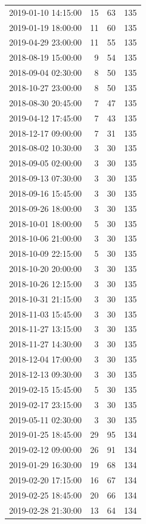 \begin{tabular}{lrrr}
2019-01-10 14:15:00 & 15 & 63 & 135 \\
2019-01-19 18:00:00 & 11 & 60 & 135 \\
2019-04-29 23:00:00 & 11 & 55 & 135 \\
2018-08-19 15:00:00 & 9 & 54 & 135 \\
2018-09-04 02:30:00 & 8 & 50 & 135 \\
2018-10-27 23:00:00 & 8 & 50 & 135 \\
2018-08-30 20:45:00 & 7 & 47 & 135 \\
2019-04-12 17:45:00 & 7 & 43 & 135 \\
2018-12-17 09:00:00 & 7 & 31 & 135 \\
2018-08-02 10:30:00 & 3 & 30 & 135 \\
2018-09-05 02:00:00 & 3 & 30 & 135 \\
2018-09-13 07:30:00 & 3 & 30 & 135 \\
2018-09-16 15:45:00 & 3 & 30 & 135 \\
2018-09-26 18:00:00 & 3 & 30 & 135 \\
2018-10-01 18:00:00 & 5 & 30 & 135 \\
2018-10-06 21:00:00 & 3 & 30 & 135 \\
2018-10-09 22:15:00 & 5 & 30 & 135 \\
2018-10-20 20:00:00 & 3 & 30 & 135 \\
2018-10-26 12:15:00 & 3 & 30 & 135 \\
2018-10-31 21:15:00 & 3 & 30 & 135 \\
2018-11-03 15:45:00 & 3 & 30 & 135 \\
2018-11-27 13:15:00 & 3 & 30 & 135 \\
2018-11-27 14:30:00 & 3 & 30 & 135 \\
2018-12-04 17:00:00 & 3 & 30 & 135 \\
2018-12-13 09:30:00 & 3 & 30 & 135 \\
2019-02-15 15:45:00 & 5 & 30 & 135 \\
2019-02-17 23:15:00 & 3 & 30 & 135 \\
2019-05-11 02:30:00 & 3 & 30 & 135 \\
2019-01-25 18:45:00 & 29 & 95 & 134 \\
2019-02-12 09:00:00 & 26 & 91 & 134 \\
2019-01-29 16:30:00 & 19 & 68 & 134 \\
2019-02-20 17:15:00 & 16 & 67 & 134 \\
2019-02-25 18:45:00 & 20 & 66 & 134 \\
2019-02-28 21:30:00 & 13 & 64 & 134 \\

\end{tabular}
